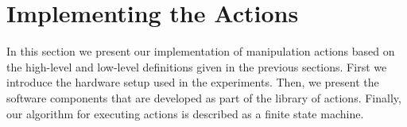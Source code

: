 \section{Implementing the Actions}
\label{sec:Implementing}

In this section we present our implementation of manipulation actions based on the high-level and low-level definitions given in the previous sections.
First we introduce the hardware setup used in the experiments.
Then, we present the software components that are developed as part of the library of actions.
Finally, our algorithm for executing actions is described as a finite state machine.

% 
% 
% 
% 

